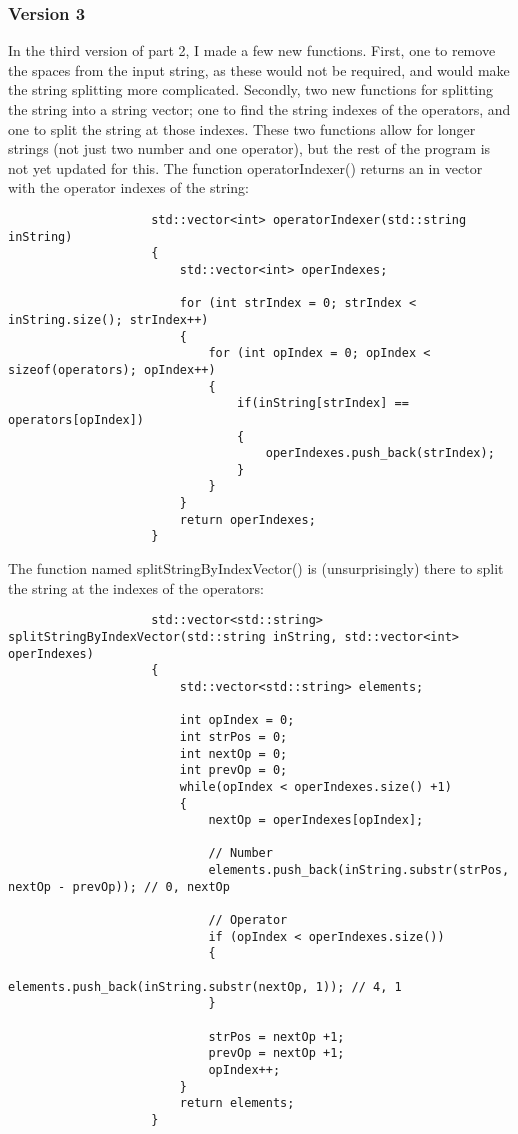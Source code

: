 \documentclass{article}
\begin{document}
			
			\subsubsection{Version 3}
				In the third version of part 2, I made a few new functions. First, one to remove the spaces from the input string, as these would not be required, and would make the string splitting more complicated. Secondly, two new functions for splitting the string into a string vector; one to find the string indexes of the operators, and one to split the string at those indexes. These two functions allow for longer strings (not just two number and one operator), but the rest of the program is not yet updated for this.
				The function operatorIndexer() returns an in vector with the operator indexes of the string:
				\begin{lstlisting}
					std::vector<int> operatorIndexer(std::string inString)
					{
						std::vector<int> operIndexes;
						
						for (int strIndex = 0; strIndex < inString.size(); strIndex++)
						{
							for (int opIndex = 0; opIndex < sizeof(operators); opIndex++)
							{
								if(inString[strIndex] == operators[opIndex])
								{
									operIndexes.push_back(strIndex);
								}
							}
						}
						return operIndexes;
					}
				\end{lstlisting}
				
				The function named splitStringByIndexVector() is (unsurprisingly) there to split the string at the indexes of the operators:
				\begin{lstlisting}
					std::vector<std::string> splitStringByIndexVector(std::string inString, std::vector<int> operIndexes)
					{
						std::vector<std::string> elements;
						
						int opIndex = 0;
						int strPos = 0;
						int nextOp = 0;
						int prevOp = 0;
						while(opIndex < operIndexes.size() +1)
						{
							nextOp = operIndexes[opIndex];
							
							// Number
							elements.push_back(inString.substr(strPos, nextOp - prevOp)); // 0, nextOp
							
							// Operator
							if (opIndex < operIndexes.size())
							{
								elements.push_back(inString.substr(nextOp, 1)); // 4, 1
							}
							
							strPos = nextOp +1;
							prevOp = nextOp +1;
							opIndex++;
						}
						return elements;
					}
				\end{lstlisting}
				
\end{document}
